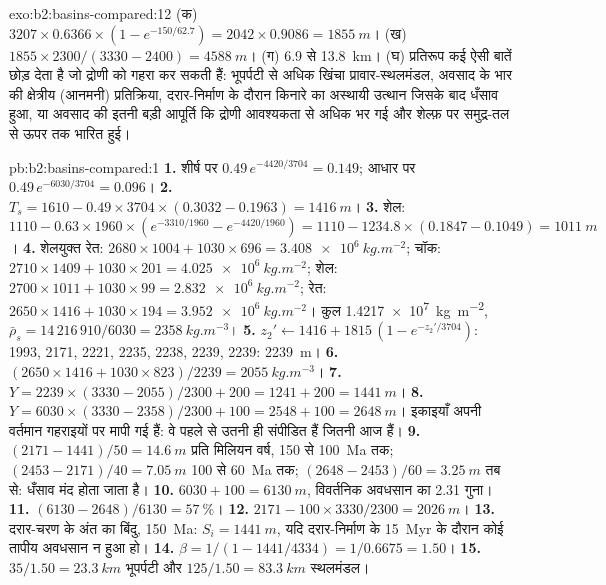 \begin{solution}{exo:b2:basins-compared:12}
(क) $3207\times0.6366\times(1 - e^{-150/62.7}) = 2042\times0.9086 = \qty{1855}{m}$। (ख) $1855\times
2300/(3330 - 2400) = \qty{4588}{m}$। (ग) 6.9 से \qty{13.8}{km}। (घ) प्रतिरूप कई ऐसी बातें
छोड़ देता है जो द्रोणी को गहरा कर सकती हैं: भूपर्पटी से अधिक खिंचा प्रावार-स्थलमंडल, अवसाद के भार की
क्षेत्रीय (आनमनी) प्रतिक्रिया, दरार-निर्माण के दौरान किनारे का अस्थायी उत्थान
जिसके बाद धँसाव हुआ, या अवसाद की इतनी बड़ी आपूर्ति कि द्रोणी आवश्यकता से अधिक भर गई और शेल्फ़ पर
समुद्र-तल से ऊपर तक भारित हुई।
\end{solution}

\begin{solution}{pb:b2:basins-compared:1}
\textbf{1.} शीर्ष पर $0.49\,e^{-4420/3704} = 0.149$; आधार पर $0.49\,e^{-6030/3704} = 0.096$।
\textbf{2.} $T_s = 1610 - 0.49\times3704\times(0.3032 - 0.1963) = \qty{1416}{m}$।
\textbf{3.} शेल: $1110 - 0.63\times1960\times(e^{-3310/1960} - e^{-4420/1960}) = 1110 - 1234.8
\times(0.1847 - 0.1049) = \qty{1011}{m}$।
\textbf{4.} शेलयुक्त रेत: $2680\times1004 + 1030\times696 = \qty{3.408e6}{kg.m^{-2}}$; चॉक:
$2710\times1409 + 1030\times201 = \qty{4.025e6}{kg.m^{-2}}$; शेल: $2700\times1011 + 1030\times99 =
\qty{2.832e6}{kg.m^{-2}}$; रेत: $2650\times1416 + 1030\times194 = \qty{3.952e6}{kg.m^{-2}}$। कुल
\qty{1.4217e7}{kg.m^{-2}}, $\bar\rho_s = 14\,216\,910/6030 = \qty{2358}{kg.m^{-3}}$।
\textbf{5.} $z_2' \leftarrow 1416 + 1815\,(1 - e^{-z_2'/3704})$: 1993, 2171, 2221, 2235, 2238, 2239,
2239: \qty{2239}{m}।
\textbf{6.} $(2650\times1416 + 1030\times823)/2239 = \qty{2055}{kg.m^{-3}}$।
\textbf{7.} $Y = 2239\times(3330 - 2055)/2300 + 200 = 1241 + 200 = \qty{1441}{m}$।
\textbf{8.} $Y = 6030\times(3330 - 2358)/2300 + 100 = 2548 + 100 = \qty{2648}{m}$। इकाइयाँ
अपनी वर्तमान गहराइयों पर मापी गई हैं: वे पहले से उतनी ही संपीडित हैं जितनी आज हैं।
\textbf{9.} $(2171 - 1441)/50 = \qty{14.6}{m}$ प्रति मिलियन वर्ष, 150 से \qty{100}{Ma} तक;
$(2453 - 2171)/40 = \qty{7.05}{m}$ 100 से \qty{60}{Ma} तक; $(2648 - 2453)/60 = \qty{3.25}{m}$
तब से: धँसाव मंद होता जाता है।
\textbf{10.} $6030 + 100 = \qty{6130}{m}$, विवर्तनिक अवधसान का 2.31 गुना।
\textbf{11.} $(6130 - 2648)/6130 = \qty{57}{\percent}$।
\textbf{12.} $2171 - 100\times3330/2300 = \qty{2026}{m}$।
\textbf{13.} दरार-चरण के अंत का बिंदु, \qty{150}{Ma}: $S_i = \qty{1441}{m}$, यदि
दरार-निर्माण के \qty{15}{Myr} के दौरान कोई तापीय अवधसान न हुआ हो।
\textbf{14.} $\beta = 1/(1 - 1441/4334) = 1/0.6675 = 1.50$।
\textbf{15.} $35/1.50 = \qty{23.3}{km}$ भूपर्पटी और $125/1.50 = \qty{83.3}{km}$ स्थलमंडल।

\end{solution}

